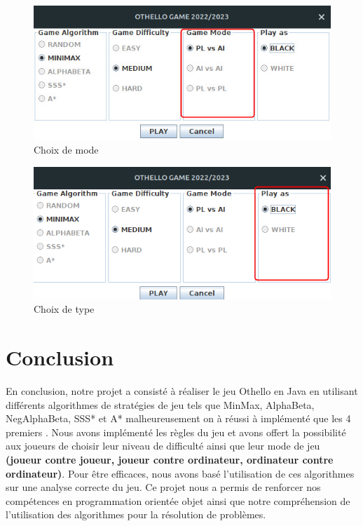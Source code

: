 \documentclass[12pt]{article}
\begin{document}
	\begin{figure}[H]
	\centering
	\includegraphics[scale=0.7]{img/othello_startMode.jpg}
	\caption{Choix de mode }
	\label{mode}
\end{figure}

	\begin{figure}[H]
	\centering
	\includegraphics[scale=0.7]{img/othelloStartJoueur.png}
	\caption{Choix de type }
	\label{joueur}
\end{figure}
	
	
	
	
	
	
	
	
	
	
	
	
	
	
	
	
	
	
	
	
	
	
	
	
	
	
	
	
	\section{Conclusion}
En conclusion, notre projet a consisté à réaliser le jeu Othello en Java en utilisant différents algorithmes de stratégies de jeu tels que MinMax, AlphaBeta, NegAlphaBeta, SSS* et A* malheureusement on à réussi à implémenté que les 4 premiers . Nous avons implémenté les règles du jeu et avons offert la possibilité aux joueurs de choisir leur niveau de difficulté ainsi que leur mode de jeu \textbf{(joueur contre joueur, joueur contre ordinateur, ordinateur contre ordinateur)}. Pour être efficaces, nous avons basé l'utilisation de ces algorithmes sur une analyse correcte du jeu. Ce projet nous a permis de renforcer nos compétences en programmation orientée objet ainsi que notre compréhension de l'utilisation des algorithmes pour la résolution de problèmes.
\end{document}
